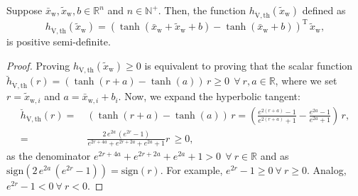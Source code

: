 \begin{lemma}\label{lemma:con:V_d_tanh_term_lower_bound}
    Suppose $\bar{x}_\mathrm{w}, \tilde{x}_\mathrm{w}, b \in \mathbb{R}^n$ and $n \in \mathbb{N}^+$. Then, the function $h_{\dot{\mathrm{V}},\mathrm{th}}(\tilde{x}_\mathrm{w})$ defined as
    \begin{equation}
        h_{\dot{\mathrm{V}},\mathrm{th}}(\tilde{x}_\mathrm{w}) = \left ( \tanh(\bar{x}_\mathrm{w} + \tilde{x}_\mathrm{w} + b) - \tanh(\bar{x}_\mathrm{w} + b) \right )^\mathrm{T} \, \tilde{x}_\mathrm{w},
    \end{equation}
    is positive semi-definite.
\end{lemma}
\begin{proof}
    Proving $h_{\dot{\mathrm{V}},\mathrm{th}}(\tilde{x}_\mathrm{w}) \geq 0$ is equivalent to proving that the scalar function $\breve{h}_{\dot{\mathrm{V}},\mathrm{th}}(r) = \left ( \tanh(r + a) - \tanh(a) \right ) \, r \geq 0 \: \: \forall \: r, a \in \mathbb{R}$, where we set $r = \tilde{x}_{\mathrm{w},i}$ and $a = \bar{x}_{\mathrm{w},i} + b_i$.
    Now, we expand the hyperbolic tangent:
    \begin{equation}
    \begin{split}
        \breve{h}_{\dot{\mathrm{V}},\mathrm{th}}(r) =& \: \left ( \tanh(r + a) - \tanh(a) \right ) \, r = \left ( \frac{e^{2(r+a)}-1}{e^{2(r+a)}+1} - \frac{e^{2a}-1}{e^{2a}+1} \right ) \, r,\\
        =& \: \frac{2 \, e^{2a} \, \left ( e^{2r} - 1 \right )}{e^{2r+4a}+e^{2r + 2a}+e^{2a}+1} r \, \geq 0,
    \end{split}
    \end{equation}
    as the denominator $e^{2r+4a}+e^{2r + 2a}+e^{2a}+1 > 0 \:\: \forall \: r \in \mathbb{R}$ and as $\mathrm{sign} \left (2 \, e^{2a} \, \left ( e^{2r} - 1 \right ) \right) = \mathrm{sign}(r)$. For example, $e^{2r} - 1 \geq 0 \: \forall \: r \geq 0$. Analog, $e^{2r} - 1 < 0 \: \forall \: r < 0$. 
\end{proof}

